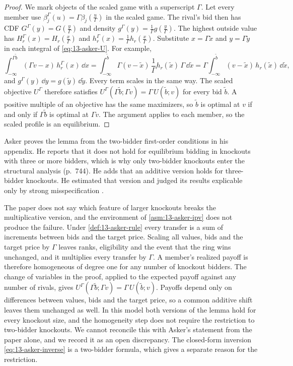 \begin{proof}
We mark objects of the scaled game with a superscript $\Gamma$. Let every member use
$\beta_j^{\Gamma}(u)=\Gamma\beta_j(\frac{u}{\Gamma})$ in the scaled game. The rival's bid then has CDF
$G^{\Gamma}(y)=G(\frac{y}{\Gamma})$ and density $g^{\Gamma}(y)=\frac{1}{\Gamma}g(\frac{y}{\Gamma})$. The highest
outside value has $H_r^{\Gamma}(x)=H_r(\frac{x}{\Gamma})$ and $h_r^{\Gamma}(x)=\frac{1}{\Gamma}h_r(\frac{x}{\Gamma})$.
Substitute $x=\Gamma\tilde x$ and $y=\Gamma\tilde y$ in each integral of \eqref{eq:13-asker-U}. For example,
\[
\int_{-\infty}^{\Gamma\tilde b}(\Gamma v-x)\,h_r^{\Gamma}(x)\,\dd x
=\int_{-\infty}^{\tilde b}\Gamma(v-\tilde x)\,\frac{1}{\Gamma}h_r(\tilde x)\,\Gamma\,\dd\tilde x
=\Gamma\int_{-\infty}^{\tilde b}(v-\tilde x)\,h_r(\tilde x)\,\dd\tilde x ,
\]
and $g^{\Gamma}(y)\,\dd y=g(\tilde y)\,\dd\tilde y$. Every term scales in the same way. The scaled objective
$U^{\Gamma}$ therefore satisfies $U^{\Gamma}(\Gamma\tilde b;\Gamma v)=\Gamma\,U(\tilde b;v)$ for every bid
$\tilde b$. A positive multiple of an objective has the same maximizers, so $\tilde b$ is optimal at $v$ if and
only if $\Gamma\tilde b$ is optimal at $\Gamma v$. The argument applies to each member, so the scaled profile is
an equilibrium.
\end{proof}

Asker proves the lemma from the two-bidder first-order conditions in his appendix. He reports that it does not hold
for equilibrium bidding in knockouts with three or more bidders, which is why only two-bidder knockouts enter the
structural analysis (p.~744). He adds that an additive version holds for three-bidder knockouts. He estimated that
version and judged its results explicable only by strong misspecification \citep[footnote 34]{Asker2010}.

The paper does not say which feature of larger knockouts breaks the multiplicative version, and the environment of
\cref{asm:13-asker-ipv} does not produce the failure. Under \cref{def:13-asker-rule} every transfer is a sum of
increments between bids and the target price. Scaling all values, bids and the target price by $\Gamma$ leaves
ranks, eligibility and the event that the ring wins unchanged, and it multiplies every transfer by $\Gamma$. A
member's realized payoff is therefore homogeneous of degree one for any number of knockout bidders. The change of
variables in the proof, applied to the expected payoff against any number of rivals, gives
$U^{\Gamma}(\Gamma\tilde b;\Gamma v)=\Gamma\,U(\tilde b;v)$. Payoffs depend only on differences between values,
bids and the target price, so a common additive shift leaves them unchanged as well. In this model both versions
of the lemma hold for every knockout size, and the homogeneity step does not require the restriction to two-bidder
knockouts. We cannot reconcile this with Asker's statement from the paper alone, and we record it as an open
discrepancy. The closed-form inversion \eqref{eq:13-asker-inverse} is a two-bidder formula, which gives a separate
reason for the restriction.

